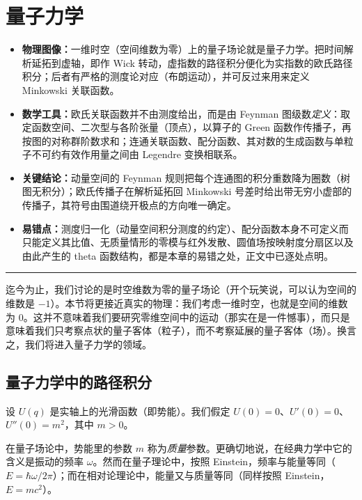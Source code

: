 \section{量子力学}

\begin{keytakeaways}
\begin{itemize}
  \item \textbf{物理图像：}一维时空（空间维数为零）上的量子场论就是量子力学。把时间解析延拓到虚轴，即作 Wick 转动，虚指数的路径积分便化为实指数的欧氏路径积分；后者有严格的测度论对应（布朗运动），并可反过来用来定义 Minkowski 关联函数。
  \item \textbf{数学工具：}欧氏关联函数并不由测度给出，而是由 Feynman 图级数\emph{定义}：取定函数空间、二次型与各阶张量（顶点），以算子的 Green 函数作传播子，再按图的对称群阶数求和；连通关联函数、配分函数、其对数的生成函数与单粒子不可约有效作用量之间由 Legendre 变换相联系。
  \item \textbf{关键结论：}动量空间的 Feynman 规则把每个连通图的积分重数降为圈数（树图无积分）；欧氏传播子在解析延拓回 Minkowski 号差时给出带无穷小虚部的传播子，其符号由围道绕开极点的方向唯一确定。
  \item \textbf{易错点：}测度归一化（动量空间积分测度的约定）、配分函数本身不可定义而只能定义其比值、无质量情形的零模与红外发散、圆值场按映射度分扇区以及由此产生的 theta 函数结构，都是本章的易错之处，正文中已逐处点明。
\end{itemize}
\end{keytakeaways}

\bigskip
\noindent\rule{\textwidth}{0.6pt}
\bigskip

迄今为止，我们讨论的是时空维数为零的量子场论（开个玩笑说，可以认为空间的维数是 $-1$）。本节将更接近真实的物理：我们考虑一维时空，也就是空间的维数为 $0$。这并不意味着我们要研究零维空间中的运动（那实在是一件憾事），而只是意味着我们只考察点状的量子客体（粒子），而不考察延展的量子客体（场）。换言之，我们将进入量子力学的领域。

\subsection{量子力学中的路径积分}
设 $U(q)$ 是实轴上的光滑函数（即势能）。我们假定 $U(0)=0$、$U'(0)=0$、$U''(0)=m^2$，其中 $m>0$。

\begin{remark} 在量子场论中，势能里的参数 $m$ 称为\emph{质量}参数。更确切地说，在经典力学中它的含义是振动的频率 $\omega$。然而在量子理论中，按照 Einstein，频率与能量等同（$E=\hbar \omega/2\pi$）；而在相对论理论中，能量又与质量等同（同样按照 Einstein，$E=mc^2$）。
\end{remark} 

